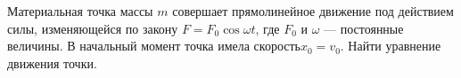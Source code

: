 Материальная точка массы $m$ совершает прямолинейное движение под
действием силы, изменяющейся по закону $F=F_0 \cos \omega t$, где $F_0$
и $\omega$ --- постоянные величины. В начальный момент точка имела  
скорость$x_0=v_0$. Найти уравнение движения точки.
